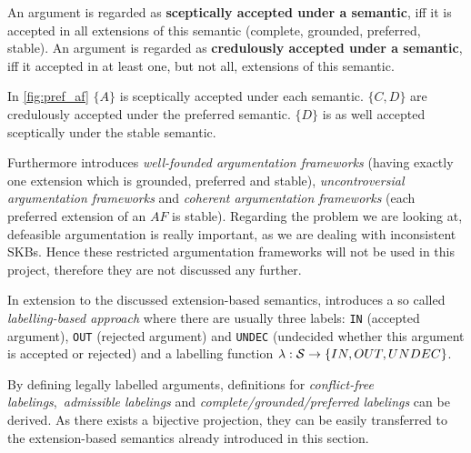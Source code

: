 \begin{definition}
An argument is regarded as \textbf{sceptically accepted under a semantic}, iff it is accepted in all extensions of this semantic (complete, grounded, preferred, stable). An argument is regarded as \textbf{credulously accepted under a semantic}, iff it accepted in at least one, but not all, extensions of this semantic. 	
\end{definition}

\begin{exa}
In \autoref{fig:pref_af} $\{A\}$ is sceptically accepted under each semantic. $\{C, D\}$ are credulously accepted under the preferred semantic. $\{D\}$ is as well accepted sceptically under the stable semantic.
\end{exa}


Furthermore \cite{dung1995} introduces \textit{well-founded argumentation frameworks} (having exactly one extension which is grounded, preferred and stable), \textit{uncontroversial argumentation frameworks} and \textit{coherent argumentation frameworks} (each preferred extension of an $AF$ is stable). Regarding the problem we are looking at, defeasible argumentation is really important, as we are dealing with inconsistent \glspl{SKB}. Hence these restricted argumentation frameworks will not be used in this project, therefore they are not discussed any further.

In extension to the discussed extension-based semantics, \cite{liao} introduces a so called \textit{labelling-based approach} where there are usually three labels: \texttt{IN} (accepted argument), \texttt{OUT} (rejected argument) and \texttt{UNDEC} (undecided whether this argument is accepted or rejected) and a labelling function $\lambda: \S \rightarrow \{IN, OUT, UNDEC\}$.

By defining legally labelled arguments, definitions for \textit{conflict-free labelings},~\textit{admissible labelings} and \textit{complete/grounded/preferred labelings} can be derived. As there exists a bijective projection, they can be easily transferred to the extension-based semantics already introduced in this section.

